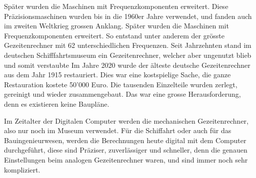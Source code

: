 Später wurden die Maschinen mit Frequenzkomponenten erweitert.
Diese Präzisionsmaschinen wurden bis in die 1960er Jahre verwendet, und fanden auch im zweiten Weltkrieg grossen Anklang.
Später wurden die Maschinen mit Frequenzkomponenten erweitert.
So entstand unter anderem der grösste Gezeitenrechner mit 62 unterschiedlichen Frequenzen.
Seit Jahrzehnten stand im deutschen Schifffahrtsmuseum ein Gezeitenrechner, welcher aber ungenutzt blieb und somit verstaubte
Im Jahre 2020 wurde der älteste deutsche Gezeitenrechner aus dem Jahr 1915 restauriert.
Dies war eine kostspielige Sache, die ganze Restauration kostete 50'000 Euro.
Die tausenden Einzelteile wurden zerlegt, gereinigt und wieder zusammengebaut.
Das war eine grosse Herausforderung, denn es existieren keine Baupläne.

Im Zeitalter der Digitalen Computer werden die mechanischen Gezeitenrechner, also nur noch im Museum verwendet.
Für die Schiffahrt oder auch für das Bauingenieurwesen, werden die Berechnungen heute digital mit dem Computer durchgeführt, diese sind Präziser, zuverlässiger und schneller, denn die genauen Einstellungen beim analogen Gezeitenrechner waren, und sind immer noch sehr kompliziert.
